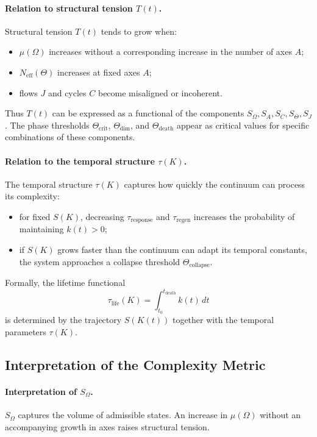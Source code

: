 \paragraph{Relation to structural tension \(T(t)\).}
Structural tension \(T(t)\) tends to grow when:
\begin{itemize}
  \item \(\mu(\Omega)\) increases without a corresponding increase in the number of axes \(A\);
  \item \(N_{\mathrm{eff}}(\Theta)\) increases at fixed axes \(A\);
  \item flows \(J\) and cycles \(C\) become misaligned or incoherent.
\end{itemize}
Thus \(T(t)\) can be expressed as a functional of the components \(S_\Omega,S_A,S_C,S_\Theta,S_J\).
The phase thresholds \(\Theta_{\mathrm{crit}}\), \(\Theta_{\mathrm{dim}}\), and \(\Theta_{\mathrm{death}}\) appear as critical values for specific combinations of these components.

\paragraph{Relation to the temporal structure \(\tau(K)\).}
The temporal structure \(\tau(K)\) captures how quickly the continuum can process its complexity:
\begin{itemize}
  \item for fixed \(S(K)\), decreasing \(\tau_{\mathrm{response}}\) and \(\tau_{\mathrm{regen}}\) increases the probability of maintaining \(k(t)>0\);
  \item if \(S(K)\) grows faster than the continuum can adapt its temporal constants, the system approaches a collapse threshold \(\Theta_{\mathrm{collapse}}\).
\end{itemize}
Formally, the lifetime functional
\[
  \tau_{\mathrm{life}}(K) = \int_{t_0}^{t_{\mathrm{death}}} k(t)\,dt
\]
is determined by the trajectory \(S(K(t))\) together with the temporal parameters \(\tau(K)\).

\subsection{Interpretation of the Complexity Metric}

\paragraph{Interpretation of \texorpdfstring{\(S_\Omega\)}{S_\Omega}.}
\(S_\Omega\) captures the volume of admissible states.
An increase in \(\mu(\Omega)\) without an accompanying growth in axes raises structural tension.

